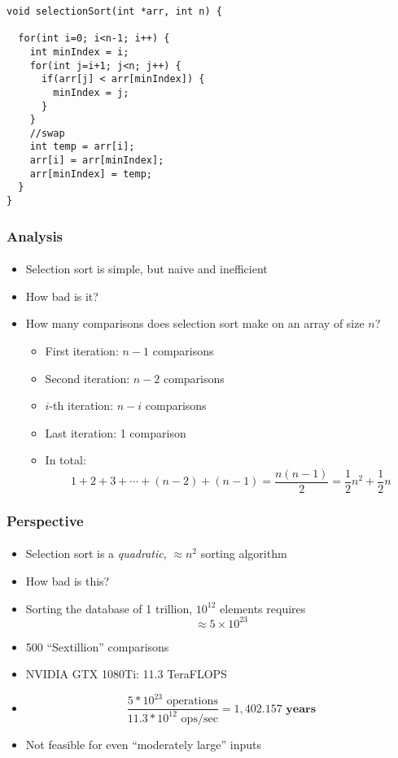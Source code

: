 \documentclass[]{beamer}
\begin{document}
\begin{frame}[fragile]
  \frametitle{}
  \framesubtitle{}

\begin{verbatim}
void selectionSort(int *arr, int n) {

  for(int i=0; i<n-1; i++) {
    int minIndex = i;
    for(int j=i+1; j<n; j++) {
      if(arr[j] < arr[minIndex]) {
        minIndex = j;
      }
    }
    //swap
    int temp = arr[i];
    arr[i] = arr[minIndex];
    arr[minIndex] = temp;
  }
}
\end{verbatim}
  
\end{frame}

\begin{frame}[fragile]
  \frametitle{Analysis}
  \framesubtitle{} 
  
\begin{itemize}[<+->]
  \item Selection sort is simple, but naive and inefficient
  \item How bad is it?
  \item How many comparisons does selection sort make on an array of size $n$?
  \begin{itemize}
    \item First iteration: $n-1$ comparisons 
    \item Second iteration: $n-2$ comparisons
    \item $i$-th iteration: $n-i$ comparisons
    \item Last iteration: 1 comparison
    \item In total: 
      $$1 + 2 + 3 + \cdots + (n-2) + (n-1) = \frac{n(n-1)}{2} = \frac{1}{2}n^2 + \frac{1}{2}n$$
  \end{itemize}
\end{itemize}
\end{frame}

\begin{frame}[fragile]
  \frametitle{Perspective}
  \framesubtitle{} 
  
\begin{itemize}[<+->]
  \item Selection sort is a \emph{quadratic}, $\approx n^2$ sorting algorithm
  \item How bad is this?
  \item Sorting the database of 1 trillion, $10^{12}$ elements requires
    $$\approx 5 \times 10^{23}$$
  \item 500 ``Sextillion'' comparisons
  \item NVIDIA GTX 1080Ti: 11.3 TeraFLOPS
  \item[~]
    $$\frac{5 * 10^{23} \textrm{ operations}}{11.3 * 10^{12} \textrm{ ops/sec}} = 1,402.157 \textbf{ years}$$
  \item Not feasible for even ``moderately large'' inputs
\end{itemize}

\end{frame}
\end{document}

